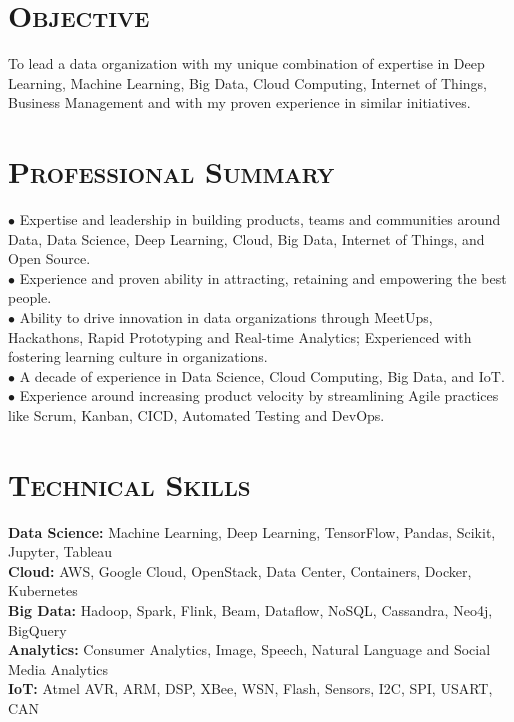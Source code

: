 \begin{resume}


\section{\textsc{Objective}} To lead a data organization with my unique combination of expertise in Deep Learning, Machine Learning, Big Data, Cloud Computing, Internet of Things, Business Management and with my proven experience in similar initiatives.
\section{\textsc{Professional Summary}}
$\bullet$ Expertise and leadership in building products, teams and communities around Data, Data Science, Deep Learning, Cloud, Big Data, Internet of Things, and Open Source.\\
$\bullet$ Experience and proven ability in attracting, retaining and empowering the best people.\\
$\bullet$ Ability to drive innovation in data organizations through MeetUps, Hackathons, Rapid Prototyping and Real-time Analytics; Experienced with fostering learning culture in organizations.\\
$\bullet$ A decade of experience in Data Science, Cloud Computing, Big Data, and IoT.\\
$\bullet$ Experience around increasing product velocity by streamlining Agile practices like Scrum, Kanban, CICD, Automated Testing and DevOps.

\section{\textsc{Technical Skills}}
{\bf Data Science:} Machine Learning, Deep Learning, TensorFlow, Pandas, Scikit, Jupyter, Tableau\\
{\bf Cloud:} AWS, Google Cloud, OpenStack, Data Center, Containers, Docker, Kubernetes \\
{\bf Big Data:} Hadoop, Spark, Flink, Beam, Dataflow, NoSQL, Cassandra, Neo4j, BigQuery\\
{\bf Analytics:} Consumer Analytics, Image, Speech, Natural Language and Social Media Analytics\\
{\bf IoT:} Atmel AVR, ARM, DSP, XBee, WSN, Flash, Sensors, I2C, SPI, USART, CAN


\end{resume}
